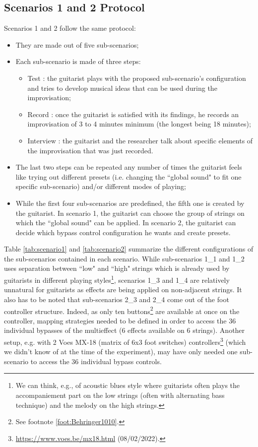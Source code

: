 \documentclass{article}
\begin{document}
\subsection{Scenarios 1 and 2 Protocol}
Scenarios 1 and 2 follow the same protocol: 
\begin{itemize}
    \item They are made out of five sub-scenarios;
    \item Each sub-scenario is made of three steps: 
    \begin{itemize}
        \item Test : the guitarist plays with the proposed sub-scenario's configuration and tries to develop musical ideas that can be used during the improvisation;
        \item Record : once the guitarist is satisfied with its findings, he records an improvisation of 3 to 4 minutes minimum (the longest being 18 minutes);
        \item Interview : the guitarist and the researcher talk about specific elements of the improvisation that was just recorded.
    \end{itemize}
    \item The last two steps can be repeated any number of times the guitarist feels like trying out different presets (i.e. changing the ``global sound" to fit one specific sub-scenario) and/or different modes of playing;
    \item While the first four sub-scenarios are predefined, the fifth one is created by the guitarist. In scenario 1, the guitarist can choose the group of strings on which the ``global sound" can be applied. In scenario 2, the guitarist can decide which bypass control configuration he wants and create presets.
\end{itemize}

Table \ref{tab:scenario1} and \ref{tab:scenario2} summarize the different configurations of the sub-scenarios contained in each scenario.
While sub-scenarios 1\_1 and 1\_2 uses separation between ``low" and ``high" strings which is already used by guitarists in different playing styles\footnote{We can think, e.g., of acoustic blues style where guitarists often plays the accompaniement part on the low strings (often with alternating bass technique) and the melody on the high strings.}, scenarios 1\_3 and 1\_4 are relatively unnatural for guitarists as effects are being applied on non-adjacent strings.
It also has to be noted that sub-scenarios 2\_3 and 2\_4 come out of the foot controller structure. Indeed, as only ten buttons\footnote{See footnote \ref{foot:Behringer1010}.} are available at once on the controller, mapping strategies needed to be defined in order to access the 36 individual bypasses of the multieffect (6 effects available on 6 strings). Another setup, e.g. with 2 Voes MX-18 (matrix of 6x3 foot switches) controllers\footnote{\url{https://www.voes.be/mx18.html} (08/02/2022).} (which we didn't know of at the time of the experiment), may have only needed one sub-scenario to access the 36 individual bypass controls.
\end{document}
